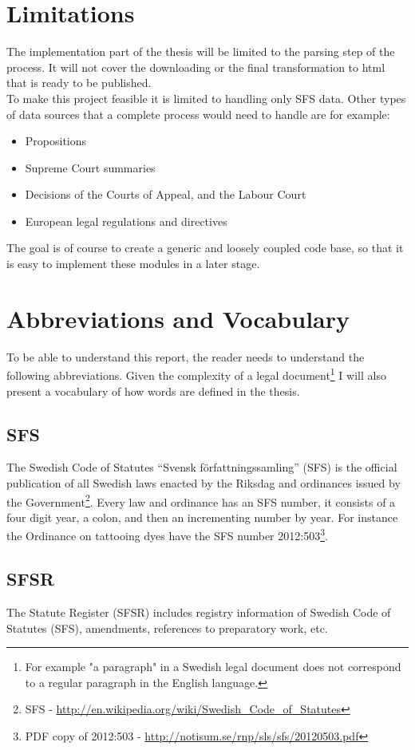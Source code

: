 \section{Limitations}
The implementation part of the thesis will be limited to the parsing step of the process. It will not cover the downloading or the final transformation to html that is ready to be published.\\
To make this project feasible it is limited to handling only SFS data. Other types of data sources that a complete process would need to handle are for example: 
\begin{itemize}
\item Propositions
\item Supreme Court summaries
\item Decisions of the Courts of Appeal, and the Labour Court 
\item European legal regulations and directives
\end{itemize}
The goal is of course to create a generic and loosely coupled code base, so that it is easy to implement these 
modules in a later stage. 

\section{Abbreviations and Vocabulary} To be able to understand this report,
the reader needs to understand the following abbreviations. Given the
complexity of a legal document\footnote{For example "a paragraph" in a Swedish
legal document does not correspond to a regular paragraph in the English
language.} I will also present a vocabulary of how words are defined in the
thesis.

\subsection*{SFS} The Swedish Code of Statutes “Svensk författningssamling”
(SFS) is the official publication of all Swedish laws enacted by the Riksdag
and ordinances issued by the Government\footnote{SFS -
\url{http://en.wikipedia.org/wiki/Swedish_Code_of_Statutes}}. Every law and
ordinance has an SFS number, it consists of a four digit year, a colon, and
then an incrementing number by year. For instance the Ordinance on tattooing
dyes have the SFS number 2012:503\footnote{PDF copy of 2012:503 -
\url{http://notisum.se/rnp/sls/sfs/20120503.pdf}}.

\subsection*{SFSR}
The Statute Register (SFSR) includes registry information of Swedish Code
of Statutes (SFS), amendments, references to preparatory work, etc.

